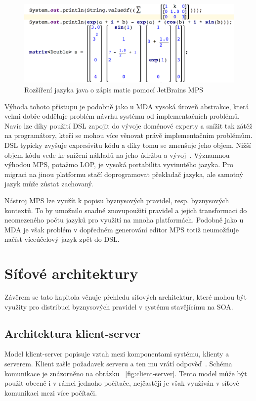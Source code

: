 \begin{figure}[t]
    \centering
    \includegraphics[keepaspectratio=true, width=0.7\linewidth]{figures/java-matrix.png}
    \caption{Rozšíření jazyka java o zápis matic pomocí JetBrains MPS}
    \label{fig:java-matrix}
\end{figure}

Výhoda tohoto přístupu je podobně jako u \gls{MDA} vysoká úroveň abstrakce, která
velmi dobře odděluje problém návrhu systému od implementačních problémů.
Navíc lze díky použití \gls{DSL} zapojit do vývoje doménové experty a snížit tak
zátěž na programátory, kteří se mohou více věnovat právě implementačním problémům.
\gls{DSL} typicky zvyšuje expresivitu kódu a díky tomu se zmenšuje jeho objem.
Nižší objem kódu vede ke snížení nákladů na jeho údržbu a vývoj~\cite{littman1987mental}\cite{soloway1986empirical}.
Významnou výhodou MPS, potažmo \gls{LOP}, je vysoká portabilita vyvinutého jazyka.
Pro migraci na jinou platformu stačí doprogramovat překladač jazyka, ale
samotný jazyk může zůstat zachovaný.

Nástroj MPS lze využít k popisu byznysových pravidel, resp. byznysových kontextů.
To by umožnilo snadné znovupoužití pravidel a jejich transformaci do neomezeného počtu jazyků pro
využití na mnoha platformách. Podobně jako u \gls{MDA} je však problém v dopředném
generování \textendash\xspace editor MPS totiž neumožňuje načíst víceúčelový jazyk zpět do \gls{DSL}.


\section{Síťové architektury}

Závěrem se tato kapitola věnuje přehledu síťových architektur, které mohou být využity pro
distribuci byznysových pravidel v systému stavějícímu na \gls{SOA}.

\subsection{Architektura klient-server}\label{sec:client-server}

Model klient-server popisuje vztah mezi komponentami systému, klienty a serverem.
Klient zašle požadavek serveru a ten mu vrátí odpověď~\cite{berson1992client}.
Schéma komunikace je znázorněno na obrázku ~\ref{fig:client-server}.
Tento model může být použit obecně i v rámci jednoho počítače,
nejčastěji je však využíván v síťové komunikaci mezi více počítači.

